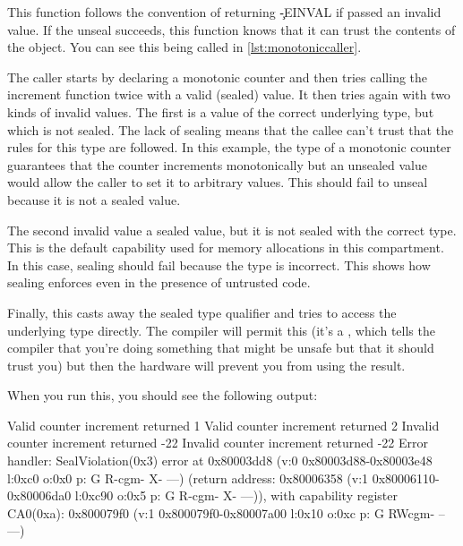 \codelisting[filename=examples/software_capability/monotonic.cc,marker=increment,label=lst:monotonicincrement,caption="The increment function for a monotonic counter."]{}

This function follows the convention of returning \c{-EINVAL} if passed an invalid value.
If the unseal succeeds, this function knows that it can trust the contents of the object.
You can see this being called in \ref{lst:monotoniccaller}.

\codelisting[filename=examples/software_capability/caller.cc,marker=entry,label=lst:monotoniccaller,caption="Calling the atomic increment function for a monotonic counter."]{}

The caller starts by declaring a monotonic counter and then tries calling the increment function twice with a valid (sealed) value.
It then tries again with two kinds of invalid values.
The first is a value of the correct underlying type, but which is not sealed.
The lack of sealing means that the callee can't trust that the rules for this type are followed.
In this example, the type of a monotonic counter guarantees that the counter increments monotonically but an unsealed value would allow the caller to set it to arbitrary values.
This should fail to unseal because it is not a sealed value.

The second invalid value  a sealed value, but it is not sealed with the correct type.
This is the default capability used for memory allocations in this compartment.
In this case, sealing should fail because the type is incorrect.
This shows how sealing enforces  even in the presence of untrusted code.

Finally, this casts away the sealed type qualifier and tries to access the underlying type directly.
The compiler will permit this (it's a , which tells the compiler that you're doing something that might be unsafe but that it should trust you) but then the hardware will prevent you from using the result.

When you run this, you should see the following output:

\begin{console}
Valid counter increment returned 1
Valid counter increment returned 2
Invalid counter increment returned -22
Invalid counter increment returned -22
Error handler: SealViolation(0x3) error at 0x80003dd8 (v:0 0x80003d88-0x80003e48 l:0xc0 o:0x0 p: G R-cgm- X- ---) (return address: 0x80006358 (v:1 0x80006110-0x80006da0 l:0xc90 o:0x5 p: G R-cgm- X- ---)), with capability register CA0(0xa): 0x800079f0 (v:1 0x800079f0-0x80007a00 l:0x10 o:0xc p: G RWcgm- -- ---)
\end{console}

